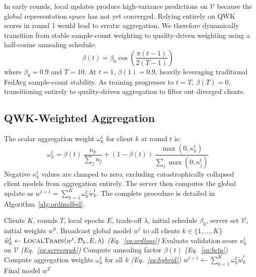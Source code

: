 In early rounds, local updates produce high-variance predictions on $\mathcal{V}$
because the global representation space has not yet converged. Relying entirely on
QWK scores in round 1 would lead to erratic aggregation. We therefore dynamically
transition from stable sample-count weighting to quality-driven weighting using a
half-cosine annealing schedule:
\begin{equation}
\beta(t) = \beta_0 \cos\!\left(\frac{\pi (t - 1)}{2 (T - 1)}\right)
\label{eq:beta}
\end{equation}
where $\beta_0 = 0.9$ and $T = 10$. At $t=1$, $\beta(1) = 0.9$, heavily leveraging
traditional FedAvg sample-count stability. As training progresses to $t=T$,
$\beta(T) = 0$, transitioning entirely to quality-driven aggregation to filter out
diverged clients.

\subsection{QWK-Weighted Aggregation}

The scalar aggregation weight $\omega_k^t$ for client $k$ at round $t$ is:
\begin{equation}
\omega_k^t =
\beta(t)\,\frac{n_k}{\sum_j n_j}
+ (1 - \beta(t))\,\frac{\max(0, \kappa_k^t)}{\sum_j \max(0, \kappa_j^t)}
\label{eq:hybrid}
\end{equation}
Negative $\kappa_k^t$ values are clamped to zero, excluding catastrophically
collapsed client models from aggregation entirely. The server then computes the
global update as $w^{t+1} = \sum_{k=1}^{K} \omega_k^t \tilde{w}_k^t$. The
complete procedure is detailed in Algorithm~\ref{alg:ordinalfed}.

\begin{algorithm}[t]
\caption{OrdinalFed Training Pipeline}
\label{alg:ordinalfed}
\small
\begin{algorithmic}[1]
\REQUIRE Clients $K$, rounds $T$, local epochs $E$, trade-off $\lambda$,
         initial schedule $\beta_0$, server set $\mathcal{V}$, initial weights $w^0$.
  \STATE Broadcast global model $w^t$ to all clients $k \in \{1,\ldots,K\}$
    \STATE $\tilde{w}_k^t \leftarrow \textsc{LocalTrain}(w^t, \mathcal{D}_k, E, \lambda)$
           \hfill\textit{(Eq.~\ref{eq:ordloss})}
    \STATE Evaluate validation score $\kappa_k^t$ on $\mathcal{V}$
           \hfill\textit{(Eq.~\ref{eq:serverqwk})}
  \ENDFOR
  \STATE Compute annealing factor $\beta(t)$
         \hfill\textit{(Eq.~\ref{eq:beta})}
  \STATE Compute aggregation weights $\omega_k^t$ for all $k$
         \hfill\textit{(Eq.~\ref{eq:hybrid})}
  \STATE $w^{t+1} \leftarrow \sum_{k=1}^{K} \omega_k^t \tilde{w}_k^t$
\ENDFOR
\RETURN Final model $w^T$
\end{algorithmic}
\end{algorithm}

